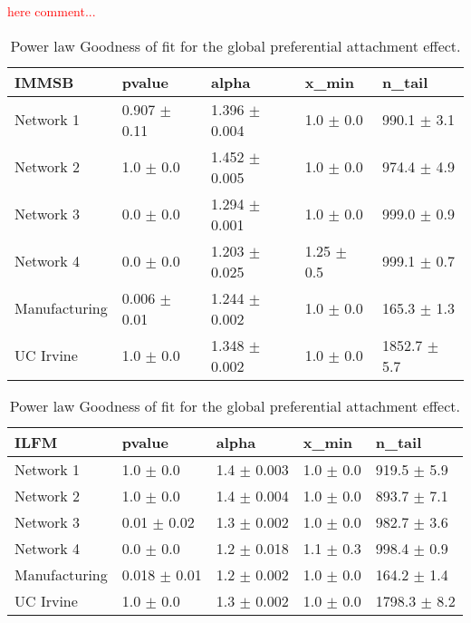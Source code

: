 \documentclass[a4paper, 12pt]{article}
\begin{document}
\textcolor{red}{here comment...} 




\begin{table}
    \label{table:global_gof}
    \caption{Power law Goodness of fit for the global preferential attachment effect.}
\centering
    \begin{tabular}{lllll}
    \hline
        \textbf{IMMSB} & pvalue          & alpha           & x\_min          & n\_tail           \\
    \hline
    Network 1     & 0.907 $\pm$ 0.11 & 1.396 $\pm$ 0.004 & 1.0 $\pm$ 0.0    & 990.1 $\pm$ 3.1  \\
    Network 2     & 1.0 $\pm$ 0.0     & 1.452 $\pm$ 0.005 & 1.0 $\pm$ 0.0    & 974.4 $\pm$ 4.9  \\
    Network 3     & 0.0 $\pm$ 0.0     & 1.294 $\pm$ 0.001 & 1.0 $\pm$ 0.0    & 999.0 $\pm$ 0.9 \\
    Network 4     & 0.0 $\pm$ 0.0     & 1.203 $\pm$ 0.025 & 1.25 $\pm$ 0.5 & 999.1 $\pm$ 0.7 \\
    Manufacturing & 0.006 $\pm$ 0.01 & 1.244 $\pm$ 0.002 & 1.0 $\pm$ 0.0    & 165.3 $\pm$ 1.3 \\
    UC Irvine     & 1.0 $\pm$ 0.0     & 1.348 $\pm$ 0.002 & 1.0 $\pm$ 0.0    & 1852.7 $\pm$ 5.7 \\
    \hline
    \end{tabular}

    \begin{tabular}{lllll}
    \hline
        \textbf{ILFM} & pvalue          & alpha           & x\_min       & n\_tail           \\
    \hline
    Network 1     & 1.0 $\pm$ 0.0     & 1.4 $\pm$ 0.003 & 1.0 $\pm$ 0.0 & 919.5 $\pm$ 5.9 \\
    Network 2     & 1.0 $\pm$ 0.0     & 1.4 $\pm$ 0.004 & 1.0 $\pm$ 0.0 & 893.7 $\pm$ 7.1  \\
    Network 3     & 0.01 $\pm$ 0.02  & 1.3 $\pm$ 0.002 & 1.0 $\pm$ 0.0 & 982.7 $\pm$ 3.6 \\
    Network 4     & 0.0 $\pm$ 0.0     & 1.2 $\pm$ 0.018 & 1.1 $\pm$ 0.3 & 998.4 $\pm$ 0.9 \\
    Manufacturing & 0.018 $\pm$ 0.01 & 1.2 $\pm$ 0.002 & 1.0 $\pm$ 0.0 & 164.2 $\pm$ 1.4 \\
    UC Irvine     & 1.0 $\pm$ 0.0     & 1.3 $\pm$ 0.002 & 1.0 $\pm$ 0.0 & 1798.3 $\pm$ 8.2 \\
    \hline
    \end{tabular}
\end{table}
\end{document}
